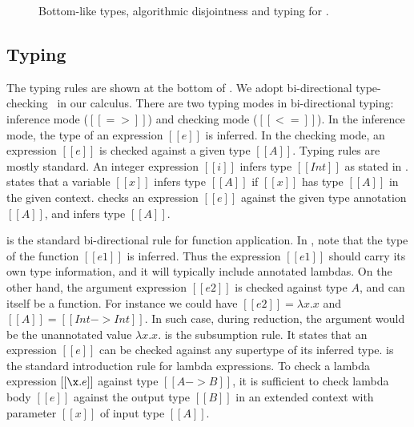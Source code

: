\begin{figure}[t]
  \begin{small}
    \centering
  \end{small}
  \begin{small}
    \centering
  \end{small}
  \begin{small}
    \centering
  \end{small}
  \caption{Bottom-like types, algorithmic disjointness and typing for \cal.}
  \label{fig:union:disj-typ}
\end{figure}


\subsection{Typing}
\label{sec:union:typ}
The typing rules are shown at the bottom of .
We adopt bi-directional type-checking~\cite{pierce2000local} in our calculus.  There
are two typing modes in bi-directional typing: inference mode
($[[=>]]$) and checking mode ($[[<=]]$). In the inference mode, the type of
an expression $[[e]]$ is inferred.  In the checking
mode, an expression $[[e]]$ is checked against a given type $[[A]]$.
Typing rules are mostly standard. An integer
expression $[[i]]$ infers type $[[Int]]$ as stated in .
 states that a variable $[[x]]$ infers type $[[A]]$ if
$[[x]]$ has type $[[A]]$ in the given context. 
checks an expression $[[e]]$ against the given type annotation $[[A]]$,
and infers type $[[A]]$.

 is the standard bi-directional rule for
function application. In , note that the type of the
function $[[e1]]$ is inferred. Thus the expression $[[e1]]$ should carry
its own type information, and it will typically include annotated lambdas.
On the other hand, the argument expression $[[e2]]$ is checked against type $A$,
and can itself be a function. For instance we could have $[[e2]] = \lambda x. x$
and $[[A]] = [[Int->Int]]$. In such case, during reduction, the argument would be
the unannotated value $\lambda x. x$.
 is the subsumption rule. It states that an expression
$[[e]]$ can be checked against any supertype of its inferred type.
 is the standard introduction rule for lambda
expressions. To check a lambda expression $[[\x.e]]$ against type $[[A
    -> B]]$, it is sufficient to check lambda body $[[e]]$ against the
output type $[[B]]$ in an extended context with parameter $[[x]]$ of
input type $[[A]]$.

